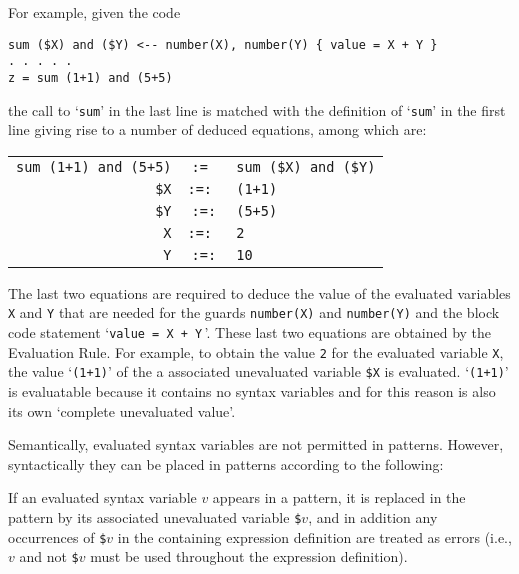 \documentclass[12pt]{article}
\newcommand{\ikey}[2]{{\bf \em #1}\index{#2}}
\newcommand{\TILDE}{\usebox{\TILDEBOX}}
\newenvironment{indpar}[1][0.3in]%
	{\begin{list}{}%
		     {\setlength{\itemsep}{0in}%
		      \setlength{\topsep}{0in}%
		      \setlength{\parsep}{1ex}%
		      \setlength{\labelwidth}{#1}%
		      \setlength{\leftmargin}{#1}%
		      \addtolength{\leftmargin}{\labelsep}}%
	 \item}%
	{\end{list}}
\begin{document}
For example, given the code

\begin{indpar}\begin{verbatim}
sum ($X) and ($Y) <-- number(X), number(Y) { value = X + Y }
. . . . .
z = sum (1+1) and (5+5)
\end{verbatim}\end{indpar}

the call to `\verb|sum|' in the last line is matched with the definition
of `\verb|sum|' in the first line giving rise to a number of deduced
equations, among which are:

\begin{center}
\begin{tabular}{rcl}
\verb/sum (1+1) and (5+5)/ & \tt :=\TILDE
			      & \verb/sum ($X) and ($Y)/ \\
\verb/$X/ & \tt :=: & \verb/(1+1)/ \\
\verb/$Y/ & \tt :=:\TILDE & \verb/(5+5)/ \\
\verb/X/ & \tt :=: & \verb/2/ \\
\verb/Y/ & \tt :=:\TILDE & \verb/10/ \\
\end{tabular}
\end{center}

The last two equations are required to deduce the value of the evaluated
variables \verb|X| and \verb|Y| that are needed for the guards
\verb|number(X)| and \verb|number(Y)| and the block code statement
`\verb|value = X + Y|\,'.  These last two equations are obtained by
the Evaluation Rule.  For example, to obtain the value \verb|2| for the
evaluated variable \verb|X|, the value `\verb|(1+1)|' of the a associated
unevaluated variable \verb|$X| is evaluated.  `\verb|(1+1)|' is
evaluatable because it contains no syntax variables and for this reason is
also its own `complete unevaluated value'.

Semantically, evaluated syntax variables are not permitted in patterns.
However, syntactically they can be placed in patterns according to the
following:

\begin{indpar}
\begin{list}{}{}
\item [\ikey{Evaluated Variable Pattern Rule}%
{evaluated variable pattern rule}:]%
\label{EVALUATED-VARIABLE-PROMOTION-RULE}
If an evaluated syntax variable $v$ appears in a pattern, it is 
replaced in the pattern by its associated unevaluated variable
\verb|$|$v$, and in addition
any occurrences of \verb|$|$v$ in the containing expression definition
are treated as errors (i.e., $v$ and not \verb|$|$v$ must be used
throughout the expression definition).
\end{list}
\end{indpar}
\end{document}
